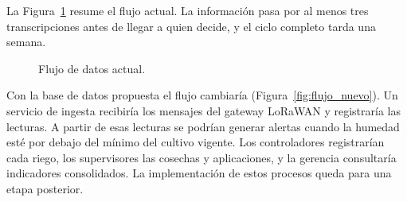 \documentclass[11pt,letterpaper]{article}
\begin{document}
La Figura~\ref{fig:flujo_actual} resume el flujo actual. La información pasa por al menos tres transcripciones antes de llegar a quien decide, y el ciclo completo tarda una semana.

\begin{figure}[H]
\centering
{}
\caption{Flujo de datos actual.}
\label{fig:flujo_actual}
\end{figure}

Con la base de datos propuesta el flujo cambiaría (Figura~\ref{fig:flujo_nuevo}). Un servicio de ingesta recibiría los mensajes del gateway LoRaWAN y registraría las lecturas. A partir de esas lecturas se podrían generar alertas cuando la humedad esté por debajo del mínimo del cultivo vigente. Los controladores registrarían cada riego, los supervisores las cosechas y aplicaciones, y la gerencia consultaría indicadores consolidados. La implementación de estos procesos queda para una etapa posterior.
\end{document}
